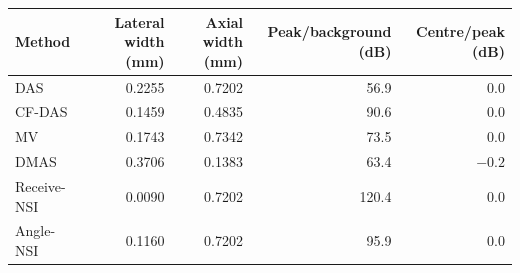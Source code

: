 \begin{tabular}{@{}lrrrr@{}}
\toprule
Method & Lateral width (mm) & Axial width (mm) & Peak/background (dB) & Centre/peak (dB) \\
\midrule
DAS & 0.2255 & 0.7202 & 56.9 & 0.0 \\
CF-DAS & 0.1459 & 0.4835 & 90.6 & 0.0 \\
MV & 0.1743 & 0.7342 & 73.5 & 0.0 \\
DMAS & 0.3706 & 0.1383 & 63.4 & $-0.2$ \\
Receive-NSI & 0.0090 & 0.7202 & 120.4 & 0.0 \\
Angle-NSI & 0.1160 & 0.7202 & 95.9 & 0.0 \\
\bottomrule
\end{tabular}
